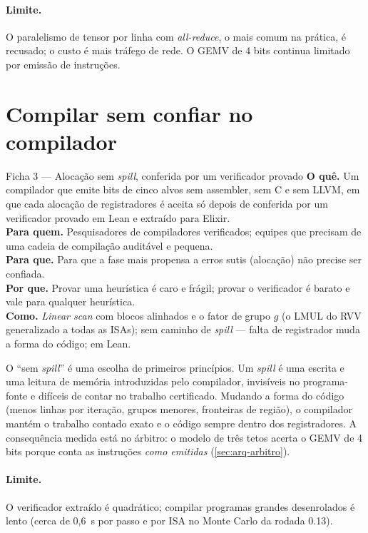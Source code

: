 \paragraph{Limite.} O paralelismo de tensor por linha com \textit{all-reduce}, o mais comum na prática, é recusado; o custo é mais tráfego de rede. O GEMV de 4 bits continua limitado por emissão de instruções.

\section{Compilar sem confiar no compilador}\label{sec:inov-alocacao}

\begin{ficha}{Ficha 3 --- Alocação sem \textit{spill}, conferida por um verificador provado}
\textbf{O quê.} Um compilador que emite bits de cinco alvos sem assembler, sem C e sem LLVM, em que cada alocação de registradores é aceita só depois de conferida por um verificador provado em Lean e extraído para Elixir.\\
\textbf{Para quem.} Pesquisadores de compiladores verificados; equipes que precisam de uma cadeia de compilação auditável e pequena.\\
\textbf{Para que.} Para que a fase mais propensa a erros sutis (alocação) não precise ser confiada.\\
\textbf{Por que.} Provar uma heurística é caro e frágil; provar o verificador é barato e vale para qualquer heurística.\\
\textbf{Como.} \textit{Linear scan} com blocos alinhados e o fator de grupo $g$ (o LMUL do RVV generalizado a todas as ISAs); sem caminho de \textit{spill} --- falta de registrador muda a forma do código;  em Lean.
\end{ficha}

O ``sem \textit{spill}'' é uma escolha de primeiros princípios. Um \textit{spill} é uma escrita e uma leitura de memória introduzidas pelo compilador, invisíveis no programa-fonte e difíceis de contar no trabalho certificado. Mudando a forma do código (menos linhas por iteração, grupos menores, fronteiras de região), o compilador mantém o trabalho contado exato e o código sempre dentro dos registradores. A consequência medida está no árbitro: o modelo de três tetos acerta o GEMV de 4 bits porque conta as instruções \emph{como emitidas} (\autoref{sec:arq-arbitro}).

\paragraph{Limite.} O verificador extraído é quadrático; compilar programas grandes desenrolados é lento (cerca de 0,6~s por passo e por ISA no Monte Carlo da rodada 0.13).

